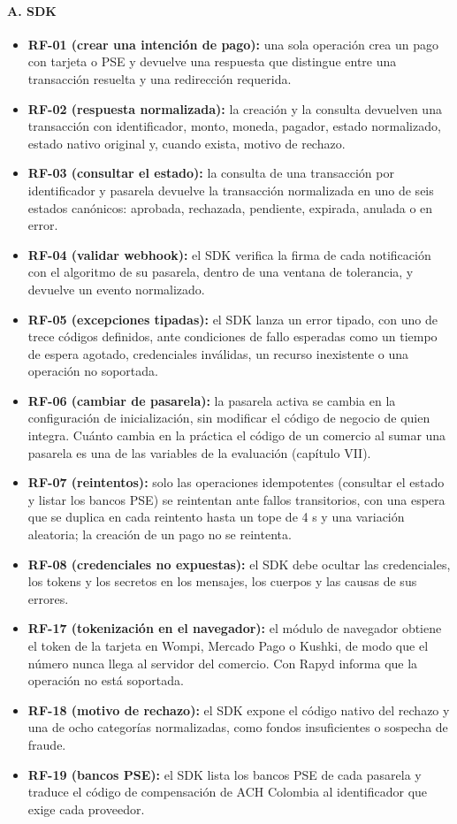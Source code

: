 \paragraph{A. SDK}
\begin{itemize}
    \item \textbf{RF-01 (crear una intención de pago):} una sola operación crea un pago con tarjeta o PSE y devuelve una respuesta que distingue entre una transacción resuelta y una redirección requerida.
    \item \textbf{RF-02 (respuesta normalizada):} la creación y la consulta devuelven una transacción con identificador, monto, moneda, pagador, estado normalizado, estado nativo original y, cuando exista, motivo de rechazo.
    \item \textbf{RF-03 (consultar el estado):} la consulta de una transacción por identificador y pasarela devuelve la transacción normalizada en uno de seis estados canónicos: aprobada, rechazada, pendiente, expirada, anulada o en error.
    \item \textbf{RF-04 (validar webhook):} el SDK verifica la firma de cada notificación con el algoritmo de su pasarela, dentro de una ventana de tolerancia, y devuelve un evento normalizado.
    \item \textbf{RF-05 (excepciones tipadas):} el SDK lanza un error tipado, con uno de trece códigos definidos, ante condiciones de fallo esperadas como un tiempo de espera agotado, credenciales inválidas, un recurso inexistente o una operación no soportada.
    \item \textbf{RF-06 (cambiar de pasarela):} la pasarela activa se cambia en la configuración de inicialización, sin modificar el código de negocio de quien integra. Cuánto cambia en la práctica el código de un comercio al sumar una pasarela es una de las variables de la evaluación (capítulo VII).
    \item \textbf{RF-07 (reintentos):} solo las operaciones idempotentes (consultar el estado y listar los bancos PSE) se reintentan ante fallos transitorios, con una espera que se duplica en cada reintento hasta un tope de 4 s y una variación aleatoria; la creación de un pago no se reintenta.
    \item \textbf{RF-08 (credenciales no expuestas):} el SDK debe ocultar las credenciales, los tokens y los secretos en los mensajes, los cuerpos y las causas de sus errores.
    \item \textbf{RF-17 (tokenización en el navegador):} el módulo de navegador obtiene el token de la tarjeta en Wompi, Mercado Pago o Kushki, de modo que el número nunca llega al servidor del comercio. Con Rapyd informa que la operación no está soportada.
    \item \textbf{RF-18 (motivo de rechazo):} el SDK expone el código nativo del rechazo y una de ocho categorías normalizadas, como fondos insuficientes o sospecha de fraude.
    \item \textbf{RF-19 (bancos PSE):} el SDK lista los bancos PSE de cada pasarela y traduce el código de compensación de ACH Colombia al identificador que exige cada proveedor.
\end{itemize}

